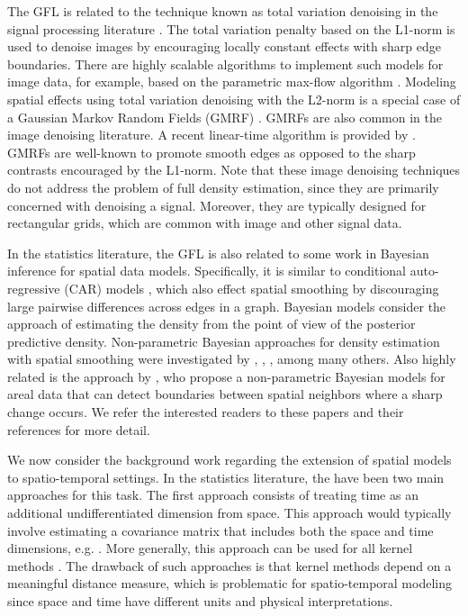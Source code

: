 \documentclass[a4paper, 11pt]{article}
\begin{document}
The GFL is related to the technique known as total variation denoising in the signal processing literature \citep{getreuer-2012}. The total variation penalty based on the L1-norm is used to denoise images by encouraging locally constant effects with sharp edge boundaries. There are highly scalable algorithms to implement such models for image data, for example, based on the parametric max-flow algorithm \citep{hochbaum-2001, chambolle-darbon-2009}. Modeling spatial effects using total variation denoising with the L2-norm is a special case of a Gaussian Markov Random Fields (GMRF) \citep{rue-held-2005}. GMRFs are also common in the image denoising literature. A recent linear-time algorithm is provided by \citet{yasuda-2018}. GMRFs are well-known to promote smooth edges as opposed to the sharp contrasts encouraged by the L1-norm. Note that these image denoising techniques do not address the problem of full density estimation, since they are primarily concerned with denoising a signal. Moreover, they are typically designed for rectangular grids, which are common with image and other signal data.

In the statistics literature, the GFL is also related to some work in Bayesian inference for spatial data models. Specifically, it is similar to conditional auto-regressive (CAR) models \citep{besag-1974}, which also effect spatial smoothing by discouraging large pairwise differences across edges in a graph. Bayesian models consider the approach of estimating the density from the point of view of the posterior predictive density. Non-parametric Bayesian approaches for density estimation with spatial smoothing were investigated by \citet{gelfand-2015}, \citet{reich-fuentes-2007}, \citet{rodriguez-2010}, among many others.  Also highly related is the approach by \citet{li-2015}, who propose a non-parametric Bayesian models for areal data that can detect boundaries between spatial neighbors where a sharp change occurs. We refer the interested readers to these papers and their references for more detail.


We now consider the background work regarding the extension of spatial models to spatio-temporal settings. In the statistics literature, the have been two main approaches for this task. The first approach consists of treating time as an additional undifferentiated dimension from space. This approach would typically involve estimating a covariance matrix that includes both the space and time dimensions, e.g. \citep{cressie-huang-1999, allcroft-glasbey-2003}. More generally, this approach can be used for all kernel methods \citep{bashtannyk-hyndman-2001}. The drawback of such approaches is that kernel methods depend on a meaningful distance measure, which is problematic for spatio-temporal modeling since space and time have different units and physical interpretations. 
\end{document}
